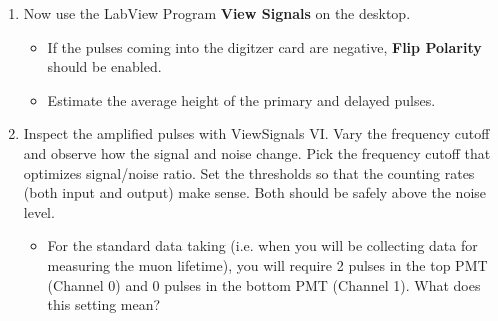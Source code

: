 \documentclass{../lab}
\begin{document}
\begin{enumerate}
    \item Now use the LabView Program \textbf{View Signals} on the desktop.

    \begin{itemize}
        \item If the pulses coming into the digitzer card are negative, \textbf{Flip Polarity} should be enabled.

        \item Estimate the average height of the primary and delayed pulses.

    \end{itemize}

    \item Inspect the amplified pulses with ViewSignals VI. Vary the frequency cutoff and observe how the signal and noise change. Pick the frequency cutoff that optimizes signal/noise ratio. Set the thresholds so that the counting rates (both input and output) make sense. Both should be safely above the noise level.

    \begin{itemize}
        \item For the standard data taking (i.e. when you will be collecting data for measuring the muon lifetime), you will require 2 pulses in the top PMT (Channel 0) and 0 pulses in the bottom PMT (Channel 1). What does this setting mean?

    \end{itemize}


\end{enumerate}
\end{document}
